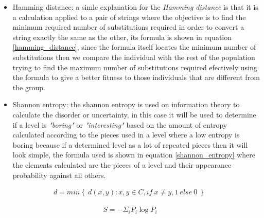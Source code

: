 \documentclass[conference]{IEEEtran}
\begin{document}
    \begin{itemize}
        \item Hamming distance: a simle explanation for the \textit{Hamming
        distance} is that it is a calculation applied to a pair of strings where the
        objective is to find the minimum required number of substitutions required in
        order to convert a string exactly the same as the other, its formula is
        shown in equation \ref{hamming_distance}, since the formula itself locates
        the minimum number of substitutions then we compare the individual
        with the rest of the population trying to find the maximum number of
        substitutions required efectively using the formula to give a better fitness
        to those individuals that are different from the group.
        \item Shannon entropy: the shannon entropy is used on information theory to
        calculate the disorder or uncertainty, in this case it will be used to
        determine if a level is \textit{"boring"} or \textit{"interesting"} based on
        the amount of entropy calculated according to the pieces used in a level
        where a low entropy is boring because if a determined level as a lot of
        repeated pieces then it will look simple, the formula used is shown in
        equation \ref{shannon_entropy} where the elements calculated are the pieces
        of a level and their appearance probability against all others.
    \end{itemize}
    
    \begin{equation}
        \begin{aligned}
        d = min \left\{ \ d(x,y): x,y \in C, if \: x \neq y, 1 \: else \: 0 \: \right\} \
        \end{aligned}
        \label{hamming_distance}
    \end{equation}
    
    \begin{equation}
        \begin{aligned}
        S = - \Sigma_i P_i \log P_i
        \end{aligned}
        \label{shannon_entropy}
    \end{equation}
    
\end{document}
